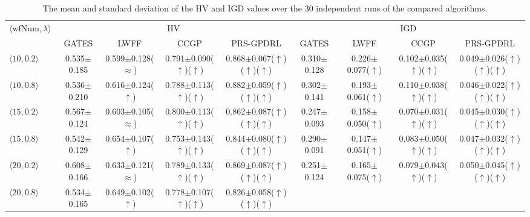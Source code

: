 \documentclass[10pt,journal]{IEEEtran}
\begin{document}
\begin{table}[!t]
\caption{The mean and standard deviation of the HV and IGD values over the 30
independent runs of the compared algorithms.}
\label{Table: main results}
\centering
\setlength{\tabcolsep}{1.6pt}
\resizebox{\textwidth}{!}%
{\begin{tabular}{@{}lcccccccc@{}}
\toprule
\multirow{2}{*}{$\langle\mathrm{wfNum},\lambda\rangle$}
& \multicolumn{4}{c}{HV} & \multicolumn{4}{c}{IGD} \\
\cmidrule(lr){2-5}\cmidrule(lr){6-9}
& GATES \cite{gates} & LWFF \cite{lwff} & CCGP \cite{ccgp} & PRS-GPDRL
& GATES \cite{gates} & LWFF \cite{lwff} & CCGP \cite{ccgp} & PRS-GPDRL \\
\midrule
$\langle10,0.2\rangle$
& 0.535$\pm$0.185 & 0.599$\pm$0.128($\approx$) & 0.791$\pm$0.090($\uparrow$)($\uparrow$) & 0.868$\pm$0.067($\uparrow$)($\uparrow$)($\uparrow$)
& 0.310$\pm$0.128 & 0.226$\pm$0.077($\uparrow$) & 0.102$\pm$0.035($\uparrow$)($\uparrow$) & 0.049$\pm$0.026($\uparrow$)($\uparrow$)($\uparrow$) \\
$\langle10,0.8\rangle$
& 0.536$\pm$0.210 & 0.616$\pm$0.124($\uparrow$) & 0.788$\pm$0.113($\uparrow$)($\uparrow$) & 0.882$\pm$0.059($\uparrow$)($\uparrow$)($\uparrow$)
& 0.302$\pm$0.141 & 0.193$\pm$0.061($\uparrow$) & 0.110$\pm$0.038($\uparrow$)($\uparrow$) & 0.046$\pm$0.022($\uparrow$)($\uparrow$)($\uparrow$) \\
$\langle15,0.2\rangle$
& 0.567$\pm$0.124 & 0.603$\pm$0.105($\approx$) & 0.800$\pm$0.113($\uparrow$)($\uparrow$) & 0.862$\pm$0.087($\uparrow$)($\uparrow$)($\uparrow$)
& 0.247$\pm$0.093 & 0.158$\pm$0.050($\uparrow$) & 0.070$\pm$0.031($\uparrow$)($\uparrow$) & 0.045$\pm$0.030($\uparrow$)($\uparrow$)($\uparrow$) \\
$\langle15,0.8\rangle$
& 0.542$\pm$0.129 & 0.654$\pm$0.107($\uparrow$) & 0.753$\pm$0.143($\uparrow$)($\uparrow$) & 0.844$\pm$0.080($\uparrow$)($\uparrow$)($\uparrow$)
& 0.290$\pm$0.091 & 0.147$\pm$0.051($\uparrow$) & 0.083$\pm$0.050($\uparrow$)($\uparrow$) & 0.047$\pm$0.032($\uparrow$)($\uparrow$)($\uparrow$) \\
$\langle20,0.2\rangle$
& 0.608$\pm$0.166 & 0.633$\pm$0.121($\approx$) & 0.789$\pm$0.133($\uparrow$)($\uparrow$) & 0.869$\pm$0.087($\uparrow$)($\uparrow$)($\uparrow$)
& 0.251$\pm$0.124 & 0.165$\pm$0.075($\uparrow$) & 0.079$\pm$0.043($\uparrow$)($\uparrow$) & 0.050$\pm$0.045($\uparrow$)($\uparrow$)($\uparrow$) \\
$\langle20,0.8\rangle$
& 0.534$\pm$0.165 & 0.649$\pm$0.102($\uparrow$) & 0.778$\pm$0.107($\uparrow$)($\uparrow$) & 0.826$\pm$0.058($\uparrow$)($\uparrow$)($\uparrow$)

\end{tabular}}
\end{table}
\end{document}
